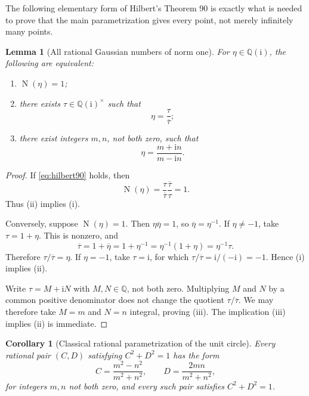 \documentclass[11pt,a4paper]{article}
\numberwithin{equation}{section}
\newtheorem{lemma}[theorem]{Lemma}
\newtheorem{corollary}[theorem]{Corollary}
\theoremstyle{definition}
\newcommand{\Q}{\mathbb{Q}}
\newcommand{\N}{\operatorname{N}}
\newcommand{\conj}[1]{\overline{#1}}
\newcommand{\ii}{\mathrm{i}}
\begin{document}
The following elementary form of Hilbert's Theorem 90 is exactly what is needed to prove that the main parametrization gives every point, not merely infinitely many points.

\begin{lemma}[All rational Gaussian numbers of norm one]
\label{lem:norm-one}
For $\eta\in\Q(\ii)$, the following are equivalent:
\begin{enumerate}
\item $\N(\eta)=1$;
\item there exists $\tau\in\Q(\ii)^\times$ such that
\begin{equation}
 \eta=\frac{\tau}{\conj{\tau}};
 \label{eq:hilbert90}
\end{equation}
\item there exist integers $m,n$, not both zero, such that
\begin{equation}
 \eta=\frac{m+\ii n}{m-\ii n}.
 \label{eq:norm-one-mn}
\end{equation}
\end{enumerate}
\end{lemma}

\begin{proof}
If \eqref{eq:hilbert90} holds, then
\[
 \N(\eta)=
 \frac{\tau}{\conj{\tau}}
 \frac{\conj{\tau}}{\tau}=1.
\]
Thus (ii) implies (i).

Conversely, suppose $\N(\eta)=1$. Then $\eta\conj{\eta}=1$, so
$\conj{\eta}=\eta^{-1}$. If $\eta\ne-1$, take $\tau=1+\eta$. This is nonzero, and
\[
 \conj{\tau}=1+\conj{\eta}
 =1+\eta^{-1}
 =\eta^{-1}(1+\eta)
 =\eta^{-1}\tau.
\]
Therefore $\tau/\conj{\tau}=\eta$. If $\eta=-1$, take $\tau=\ii$, for which
$\tau/\conj{\tau}=\ii/(-\ii)=-1$. Hence (i) implies (ii).

Write $\tau=M+\ii N$ with $M,N\in\Q$, not both zero. Multiplying $M$ and $N$ by a common positive denominator does not change the quotient $\tau/\conj{\tau}$. We may therefore take $M=m$ and $N=n$ integral, proving (iii). The implication (iii) implies (ii) is immediate.
\end{proof}

\begin{corollary}[Classical rational parametrization of the unit circle]
\label{cor:unit-circle}
Every rational pair $(C,D)$ satisfying $C^2+D^2=1$ has the form
\begin{equation}
 C=\frac{m^2-n^2}{m^2+n^2},
 \qquad
 D=\frac{2mn}{m^2+n^2},
 \label{eq:unit-circle-param}
\end{equation}
for integers $m,n$ not both zero, and every such pair satisfies $C^2+D^2=1$.
\end{corollary}
\end{document}
